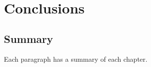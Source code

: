 
\chapter{Conclusions}
\label{ch:conclusion}

\section{Summary}

Each paragraph has a summary of each chapter.